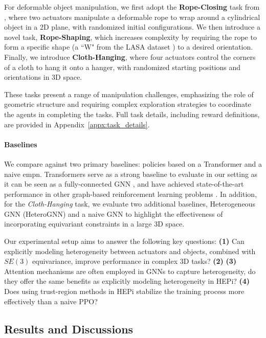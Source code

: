 For deformable object manipulation, we first adopt the \textbf{Rope-Closing} task from \cite{reform}, where two actuators manipulate a deformable rope to wrap around a cylindrical object in a 2D plane, with randomized initial configurations. We then introduce a novel task, \textbf{Rope-Shaping}, which increases complexity by requiring the rope to form a specific shape (a ``W" from the LASA dataset \citep{lasa-dataset}) to a desired orientation. Finally, we introduce \textbf{Cloth-Hanging}, where four actuators control the corners of a cloth to hang it onto a hanger, with randomized starting positions and orientations in 3D space. 

These tasks present a range of manipulation challenges, emphasizing the role of geometric structure and requiring complex exploration strategies to coordinate the agents in completing the tasks. Full task details, including reward definitions, are provided in Appendix~\ref{appx:task_details}.

\paragraph{Baselines}

We compare \model against two primary baselines: policies based on a Transformer \citep{attention} and a naive \gls{empn}. Transformers serve as a strong baseline to evaluate in our setting as it can be seen as a fully-connected GNN \citep{battaglia2018relational}, and have achieved state-of-the-art performance in other graph-based reinforcement learning problems \citep{kurin2021my, pmlr-v162-trabucco22b, gupta2022metamorph, hong2022structureaware}. In addition, for the \emph{Cloth-Hanging} task, we evaluate two additional baselines, Heterogeneous GNN (HeteroGNN) and a naive GNN to highlight the effectiveness of incorporating equivariant constraints in a large 3D space. 

Our experimental setup aims to answer the following key questions: \textbf{(1)} Can explicitly modeling heterogeneity between actuators and objects, combined with $SE(3)$ equivariance, improve performance in complex 3D tasks? \textbf{(2)}  \textbf{(3)} Attention mechanisms are often employed in GNNs to capture heterogeneity, do they offer the same benefits as explicitly modeling heterogeneity in HEPi? \textbf{(4)} Does using trust-region methods in HEPi stabilize the training process more effectively than a naive PPO?

\subsection{Results and Discussions}
\label{sec:results}

